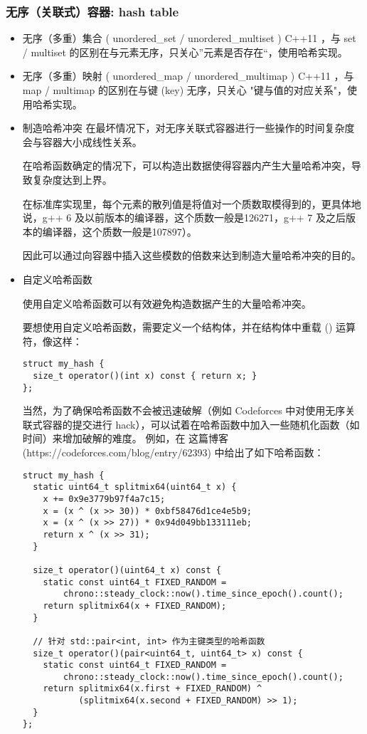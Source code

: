 \documentclass[UTF8]{ctexart}
\begin{document}
\subsubsection{无序（关联式）容器: hash table}
\begin{itemize}
\item 无序（多重）集合 ( unordered\_set / unordered\_multiset ) C++11 ，与 set / multiset 的区别在与元素无序，只关心”元素是否存在“，使用哈希实现。
\item 无序（多重）映射 ( unordered\_map / unordered\_multimap ) C++11 ，与 map / multimap 的区别在与键 (key) 无序，只关心 "键与值的对应关系"，使用哈希实现。
\item 制造哈希冲突
在最坏情况下，对无序关联式容器进行一些操作的时间复杂度会与容器大小成线性关系。


在哈希函数确定的情况下，可以构造出数据使得容器内产生大量哈希冲突，导致复杂度达到上界。


在标准库实现里，每个元素的散列值是将值对一个质数取模得到的，更具体地说，g++ 6 及以前版本的编译器，这个质数一般是126271，g++ 7 及之后版本的编译器，这个质数一般是107897）。


因此可以通过向容器中插入这些模数的倍数来达到制造大量哈希冲突的目的。

\item 自定义哈希函数


使用自定义哈希函数可以有效避免构造数据产生的大量哈希冲突。


要想使用自定义哈希函数，需要定义一个结构体，并在结构体中重载 () 运算符，像这样：
\begin{lstlisting}
struct my_hash {
  size_t operator()(int x) const { return x; }
};
\end{lstlisting}

当然，为了确保哈希函数不会被迅速破解（例如 Codeforces 中对使用无序关联式容器的提交进行 hack），可以试着在哈希函数中加入一些随机化函数（如时间）来增加破解的难度。
例如，在 这篇博客(https://codeforces.com/blog/entry/62393) 中给出了如下哈希函数：
\begin{lstlisting}
struct my_hash {
  static uint64_t splitmix64(uint64_t x) {
    x += 0x9e3779b97f4a7c15;
    x = (x ^ (x >> 30)) * 0xbf58476d1ce4e5b9;
    x = (x ^ (x >> 27)) * 0x94d049bb133111eb;
    return x ^ (x >> 31);
  }

  size_t operator()(uint64_t x) const {
    static const uint64_t FIXED_RANDOM =
        chrono::steady_clock::now().time_since_epoch().count();
    return splitmix64(x + FIXED_RANDOM);
  }

  // 针对 std::pair<int, int> 作为主键类型的哈希函数
  size_t operator()(pair<uint64_t, uint64_t> x) const {
    static const uint64_t FIXED_RANDOM =
        chrono::steady_clock::now().time_since_epoch().count();
    return splitmix64(x.first + FIXED_RANDOM) ^
           (splitmix64(x.second + FIXED_RANDOM) >> 1);
  }
};
\end{lstlisting}
\end{itemize}
\end{document}
